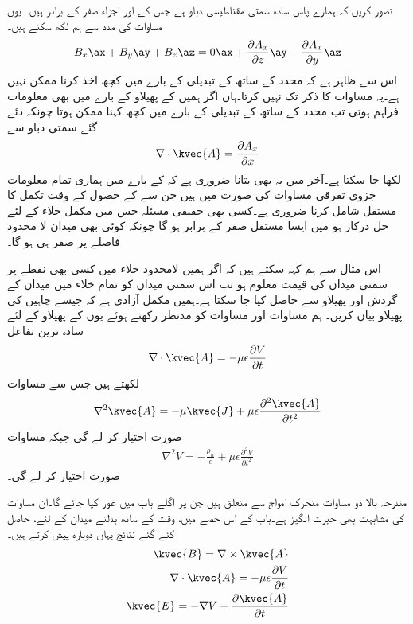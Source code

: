 تصور کریں کہ ہمارے پاس سادہ سمتی مقناطیسی دباو ہے جس کے  اور  اجزاء صفر کے برابر ہیں۔ یوں مساوات  کی مدد سے ہم لکھ سکتے ہیں۔
\begin{align*}
B_x \ax+B_y \ay+B_z \az=0\ax+\frac{\partial A_x}{\partial z}\ay-\frac{\partial A_x}{\partial y}\az
\end{align*}
اس سے ظاہر ہے کہ  محدد کے ساتھ  کے تبدیلی کے بارے میں کچھ اخذ کرنا ممکن نہیں ہے۔یہ مساوات  کا ذکر تک نہیں کرتا۔ہاں اگر ہمیں  کے پھیلاو کے بارے میں بھی معلومات فراہم ہوتی تب  محدد کے ساتھ  کے تبدیلی کے بارے میں کچھ کہنا ممکن ہوتا چونکہ دئے گئے سمتی دباو سے
\begin{align*}
\nabla \cdot \kvec{A}=\frac{\partial A_x}{\partial x}
\end{align*} 
لکھا جا سکتا ہے۔آخر میں یہ بھی بتانا ضروری ہے کہ  کے بارے میں ہماری تمام معلومات جزوی تفرقی مساوات کی صورت میں ہیں  جن سے  کے حصول کے وقت تکمل کا مستقل شامل کرنا ضروری ہے۔کسی بھی حقیقی مسئلہ جس میں مکمل خلاء کے لئے حل درکار ہو میں ایسا مستقل صفر کے برابر ہو گا چونکہ کوئی بھی میدان لا محدود فاصلے  پر صفر ہی ہو گا۔

اس مثال سے ہم کہہ سکتے ہیں کہ اگر ہمیں لامحدود خلاء میں کسی بھی نقطے پر سمتی میدان کی قیمت معلوم ہو تب اس سمتی میدان کو تمام خلاء میں میدان  کے گردش اور پھیلاو سے حاصل کیا جا سکتا ہے۔ہمیں مکمل آزادی ہے کہ جیسے چاہیں  کی پھیلاو بیان کریں۔ ہم مساوات  اور مساوات  کو مدنظر رکھتے ہوئے یوں  کے پھیلاو کے لئے سادہ ترین تفاعل
\begin{align}
\nabla \cdot \kvec{A}=-\mu \epsilon \frac{\partial V}{\partial t}
\end{align}
 لکھتے ہیں جس سے مساوات 
\begin{align}
\nabla^2 \kvec{A}=-\mu \kvec{J}+\mu \epsilon \frac{\partial^2 \kvec{A}}{\partial t^2}
\end{align}
صورت اختیار کر لے گی جبکہ مساوات 
\begin{align}
\nabla^2 V=-\frac{\rho_h}{\epsilon}+\mu \epsilon \frac{\partial^2 V}{\partial t^2}
\end{align}
صورت اختیار  کر لے گی۔

مندرجہ بالا دو مساوات متحرک امواج سے متعلق ہیں جن پر اگلے باب میں غور کیا جائے گا۔ان مساوات کی مشابہت بھی حیرت انگیز ہے۔باب کے اس حصے میں، وقت کے ساتھ بدلتے میدان کے لئے، حاصل کئے گئے نتائج یہاں دوبارہ پیش کرتے ہیں۔
\begin{align}
\kvec{B}=\nabla \times \kvec{A}   \label{مساوات_میکس_ویل_تاخیری_مقناطیسی_میدان}\\
\nabla \cdot \kvec{A}=-\mu \epsilon \frac{\partial V}{\partial t}\\
\kvec{E}=-\nabla V-\frac{\partial \kvec{A}}{\partial t}  \label{مساوات_میکس_ویل_تاخیری_برقی_میدان}
\end{align} 

